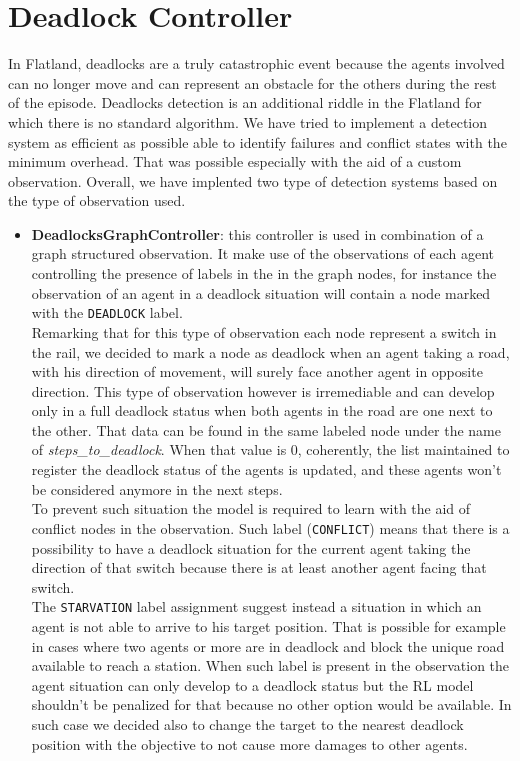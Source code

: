 \section{Deadlock Controller}
In Flatland, deadlocks are a truly catastrophic event because the agents involved can no longer move and can represent an obstacle for the others during the rest of the episode. Deadlocks detection is an additional riddle in the Flatland for which there is no standard algorithm. We have tried to implement a detection system as efficient as possible able to identify failures and conflict states with the minimum overhead. That was possible especially with the aid of a custom observation. Overall, we have implented two type of detection systems based on the type of observation used.
\begin{itemize}
	\item \textbf{DeadlocksGraphController}: this controller is used in combination of a graph structured observation. It make use of the observations of each agent controlling the presence of labels in the in the graph nodes, for instance the observation of an agent in a deadlock situation will contain a node marked with the \texttt{DEADLOCK} label.\\ Remarking that for this type of observation each node represent a switch in the rail, we decided to mark a node as deadlock when an agent taking a road, with his direction of movement, will surely face another agent in opposite direction. This type of observation however is irremediable and can develop only in a full deadlock status when both agents in the road are one next to the other. That data can be found in the same labeled node under the name of \textit{steps\_to\_deadlock}. When that value is 0, coherently, the list maintained to register the deadlock status of the agents is updated, and these agents won't be considered anymore in the next steps.\\
	To prevent such situation the model is required to learn with the aid of conflict nodes in the observation. Such label (\texttt{CONFLICT}) means that there is a possibility to have a deadlock situation for the current agent taking the direction of that switch because there is at least another agent facing that switch.\\
	The \texttt{STARVATION} label assignment suggest instead a situation in which an agent is not able to arrive to his target position. That is possible for example in cases where two agents or more are in deadlock and block the unique road available to reach a station. When such label is present in the observation the agent situation can only develop to a deadlock status but the RL model shouldn't be penalized for that because no other option would be available. In such case we decided also to change the target to the nearest deadlock position with the objective to not cause more damages to other agents.

\end{itemize}
